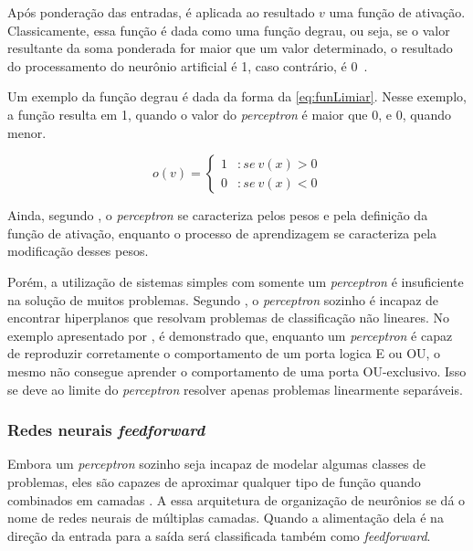 \documentclass[
    12pt,
    oneside,
    a4paper,
    english,
    brazil
]{abntex2}
\begin{document}
Após ponderação das entradas, é aplicada  ao resultado $v$  uma função  de ativação.
Classicamente, essa função é  dada como uma função degrau, ou  seja, se o valor
resultante da soma ponderada for maior que um valor determinado, o resultado do
processamento do neurônio artificial é 1, caso contrário, é 0~\cite{knight}.

Um exemplo da função degrau é dada da forma da \autoref{eq:funLimiar}. Nesse
exemplo, a função  resulta em 1, quando o valor  do \textit{perceptron} é maior
que 0, e 0, quando menor.

\begin{equation}
    \label{eq:funLimiar}
    o(v) = \left\{
        \begin{array}{lr}
            1 & :se\  v(x) > 0\\
            0 & :se\  v(x) < 0
        \end{array}
    \right.
\end{equation}

Ainda, segundo  , o \textit{perceptron} se caracteriza pelos
pesos e pela definição  da função de ativação,  enquanto o processo de
aprendizagem se caracteriza pela modificação desses pesos.

Porém, a  utilização de  sistemas simples com  somente um  \textit{perceptron} é
insuficiente  na  solução  de muitos  problemas.  Segundo  ,
o  \textit{perceptron}  sozinho é  incapaz  de  encontrar hiperplanos que resolvam problemas  de classificação não lineares. No exemplo apresentado por
, é demonstrado que, enquanto um \textit{perceptron} é capaz
de reproduzir corretamente o comportamento de um porta logica E ou OU, o mesmo não
consegue aprender o comportamento de uma porta OU-exclusivo. Isso se deve ao limite do \textit{perceptron} resolver apenas problemas linearmente separáveis.

\subsubsection{Redes neurais \textit{feedforward}}

Embora um  \textit{perceptron} sozinho seja incapaz de modelar  algumas 
classes  de  problemas, eles são capazes de aproximar qualquer tipo de função quando combinados em camadas . A  essa arquitetura de  organização de  neurônios se dá  o  nome  de  redes  neurais de  múltiplas  camadas. Quando  a  alimentação dela  é na  direção  da entrada  para  a saída  será  classificada também  como \textit{feedforward}.
\end{document}
